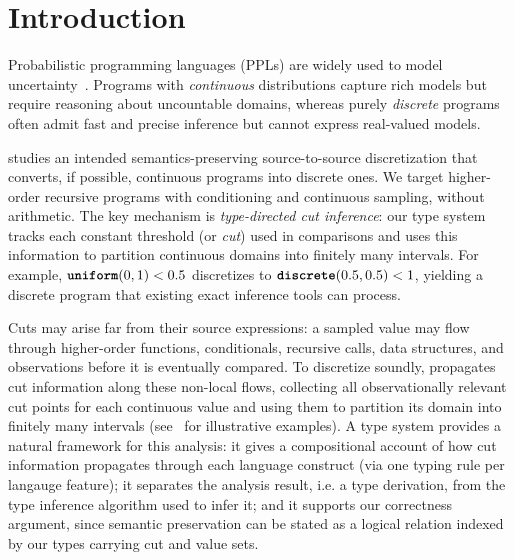 \section{Introduction}\label{sec:intro}
Probabilistic programming languages (PPLs) are widely used to model uncertainty~\cite{Moy2025Roulette,Holtzen2020Dice,DeRaedt2007ProbLog,Saad2021SPPL,Carpenter2017Stan,Salvatier2016PyMC3,Bingham2019Pyro,Dillon2017TFP,Tran2016Edward,Tolpin2016Anglican,Goodman2014WebPPL,Pfeffer2009Figaro,Minka2018InferNET,Ge2018Turing,CusumanoTowner2019Gen,Tehrani2020BeanMachine,Goodman2008Church,Narayanan2016Hakaru}. Programs with {\em continuous} distributions capture rich models but require reasoning about uncountable domains, whereas purely {\em discrete} programs often admit fast and precise inference but cannot express real-valued models.



\Slice{} studies an intended semantics-preserving source-to-source discretization that converts, if possible, continuous programs into discrete ones. We target higher-order recursive programs with conditioning and continuous sampling, without arithmetic. The key mechanism is \emph{type-directed cut inference}: our type system tracks each constant threshold (or {\em cut}) used in comparisons and uses this information to partition continuous domains into finitely many intervals. For example, $\textnormal{\ttfamily\bfseries uniform}(0,1) < 0.5$ discretizes to $\textnormal{\ttfamily\bfseries discrete}(0.5,0.5) < 1$, yielding a discrete program that existing exact inference tools can process.

Cuts may arise far from their source expressions: a sampled value may flow through higher-order functions, conditionals, recursive calls, data structures, and observations before it is eventually compared. To discretize soundly, \Slice{} propagates cut information along these non-local flows, collecting all observationally relevant cut points for each continuous value and using them to partition its domain into finitely many intervals (see~ for illustrative examples). A type system provides a natural framework for this analysis: it gives a compositional account of how cut information propagates through each language construct (via one typing rule per langauge feature); it separates the analysis result, i.e. a type derivation, from the type inference algorithm used to infer it; and it supports our correctness argument, since semantic preservation can be stated as a logical relation indexed by our types carrying cut and value sets.

